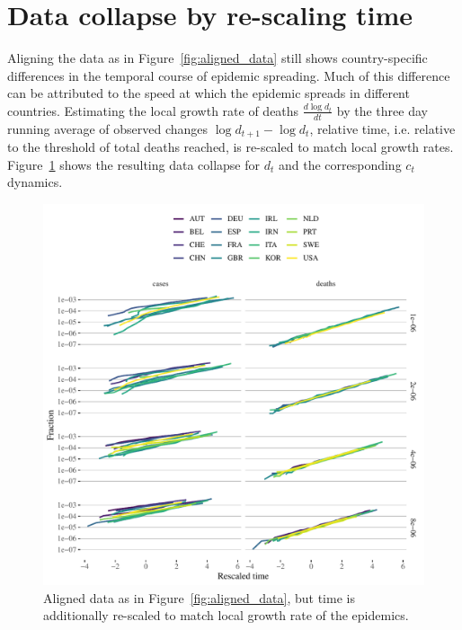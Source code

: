 \documentclass[fullpage,a4paper]{article}
\newcommand{\fig}[1]{Figure~\ref{fig:#1}}
\newcommand{\beginsupplement}{%
  \setcounter{table}{0}
  \renewcommand{\thetable}{S\arabic{table}}%
  \setcounter{figure}{0}
  \renewcommand{\thefigure}{S\arabic{figure}}%
}
\begin{document}



\clearpage

\appendix
\renewcommand\appendixname{Supplement}
\beginsupplement

\section{Data collapse by re-scaling time}

Aligning the data as in \fig{aligned_data} still shows
country-specific differences in the temporal course of epidemic
spreading. Much of this difference can be attributed to the speed at
which the epidemic spreads in different countries. Estimating the
local growth rate of deaths $\frac{d\log d_t}{dt}$ by the three day
running average of observed changes $\log d_{t+1} - \log d_t$,
relative time, i.e. relative to the threshold of total deaths reached,
is re-scaled to match local growth rates. \fig{scaling} shows the
resulting data collapse for $d_t$ and the corresponding $c_t$ dynamics.
\begin{figure}
  \includegraphics[width=1\textwidth]{../figs/ecdc_scaling_all.pdf}
  \caption{\label{fig:scaling} Aligned data as in \fig{aligned_data},
    but time is additionally re-scaled to match local growth rate of
    the epidemics.}
\end{figure}
\end{document}
